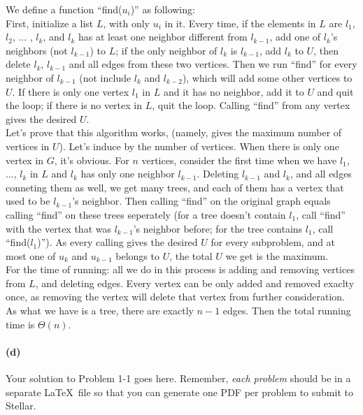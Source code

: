 \documentclass{6046}
\begin{document}
We define a function ``find($u_i$)'' as following: 
\\
First, initialize a list $L$, with only $u_i$ in it. 
Every time, if the elements in $L$ are $l_1$, $l_2$, ... , $l_k$, 
and $l_k$ has at least one neighbor different from $l_{k-1}$, 
add one of $l_k$'s neighbors (not $l_{k-1}$) to $L$; 
if the only neighbor of $l_k$ is $l_{k-1}$, 
add $l_k$ to $U$, then delete $l_k$, $l_{k-1}$ and all edges 
from these two vertices. 
Then we run ``find'' for every neighbor of $l_{k-1}$ 
(not include $l_k$ and $l_{k-2}$), 
which will add some other vertices to $U$. 
If there is only one vertex $l_1$ in $L$ and it has no neighbor, 
add it to $U$ and quit the loop; 
if there is no vertex in $L$, quit the loop.  
Calling ``find'' from any vertex gives the desired $U$. 
\\
Let's prove that this algorithm works, 
(namely, gives the maximum number of vertices in $U$). 
Let's induce by the number of vertices. 
When there is only one vertex in $G$, it's obvious. 
For $n$ vertices, 
consider the first time when 
we have $l_1$, ..., $l_k$ in $L$ and 
$l_k$ has only one neighbor $l_{k-1}$. 
Deleting $l_{k-1}$ and $l_k$, and all edges conneting them as well, 
we get many trees, 
and each of them has a vertex that used to be $l_{k-1}$'s neighbor. 
Then calling ``find'' on the original graph 
equals calling ``find'' on these trees seperately 
(for a tree doesn't contain $l_{1}$, call ``find'' with 
the vertex that was $l_{k-1}$'s neighbor before; 
for the tree contains $l_1$, call ``find($l_1$)''). 
As every calling gives the desired $U$ for every subproblem, 
and at most one of $u_k$ and $u_{k-1}$ belongs to $U$, 
the total $U$ we get is the maximum. 
\\
For the time of running: 
all we do in this process is adding and removing vertices from $L$, 
and deleting edges. 
Every vertex can be only added and removed exaclty once, 
as removing the vertex will delete that vertex from further consideration. 
As what we have is a tree, there are exactly $n-1$ edges. 
Then the total running time is $\Theta(n)$. 

\paragraph{(d)}













Your solution to Problem 1-1 goes here. Remember, \emph{each problem} should be
in a separate \LaTeX\ file so that you can generate one PDF per problem to
submit to Stellar.
\end{document}
